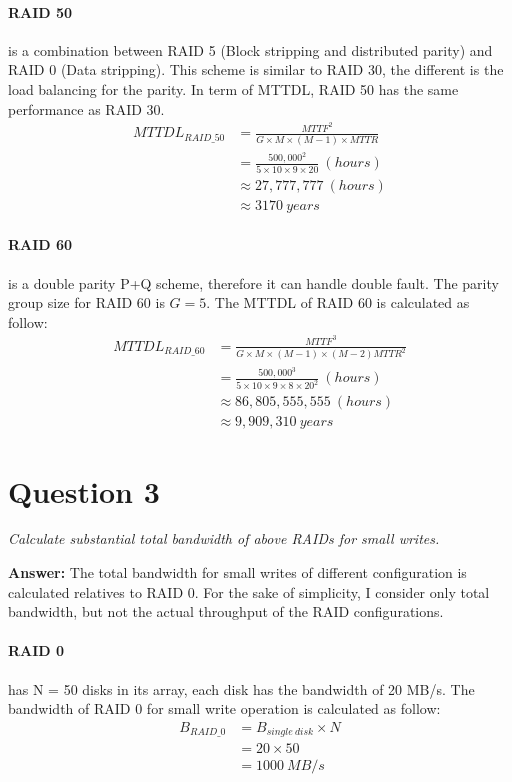 \documentclass[a4paper,11pt]{article}
\begin{document}
\paragraph{RAID 50} is a combination between RAID 5 (Block stripping and distributed parity) and RAID 0 (Data stripping). This scheme is similar to RAID 30, the different is the load balancing for the parity. In term of MTTDL, RAID 50 has the same performance as RAID 30.
\begin{equation*}
    \begin{aligned}
        MTTDL_{RAID\_50} &= \frac{MTTF^{2}}{G \times M \times (M-1) \times MTTR} \\
        & = \frac{500,000^{2}}{5 \times 10 \times 9 \times 20} \ (hours) \\ 
        & \approx 27,777,777 \ (hours) \\
        & \approx 3170 \ years
    \end{aligned}
\end{equation*}
\paragraph{RAID 60} is a double parity P+Q scheme, therefore it can handle double fault. The parity group size for RAID 60 is $G=5$. The MTTDL of RAID 60 is calculated as follow: 
\begin{equation*}
    \begin{aligned}
        MTTDL_{RAID\_60} &= \frac{MTTF^{3}}{G \times M \times (M-1) \times (M-2) MTTR^{2}} \\
        & = \frac{500,000^{3}}{5 \times 10 \times 9 \times 8 \times 20^{2}} \ (hours) \\ 
        & \approx 86,805,555,555 \ (hours) \\
        & \approx 9,909,310 \ years
    \end{aligned}
\end{equation*}
\pagebreak
\section*{Question 3}

\textit{Calculate substantial total bandwidth of above RAIDs for small writes.} 

\noindent
\textbf{Answer:} 
The total bandwidth for small writes of different configuration is calculated relatives to RAID 0. For the sake of simplicity, I consider only total bandwidth, but not the actual throughput of the RAID configurations.
\paragraph{RAID 0} has N = 50 disks in its array, each disk has the bandwidth of 20 MB/s. The bandwidth of RAID 0 for small write operation is calculated as follow:
\begin{equation*}
    \begin{aligned}
        B_{RAID\_0} &= B_{single\ disk} \times N \\
        & = 20 \times 50 \\
        & = 1000\ MB/s 
    \end{aligned}
\end{equation*}
\end{document}
